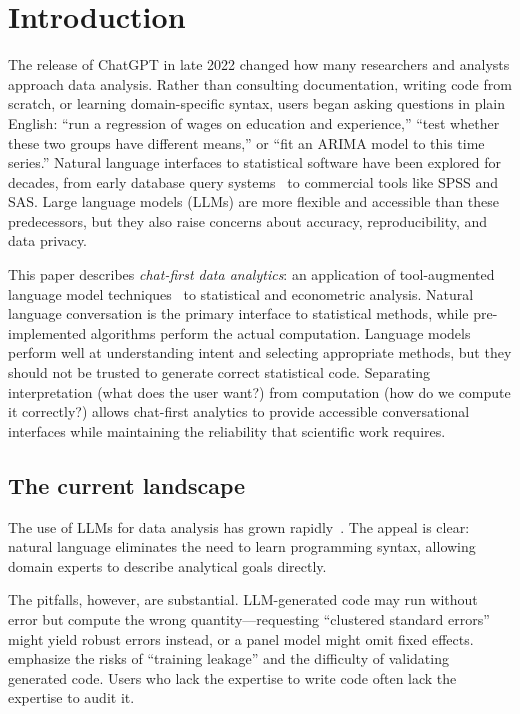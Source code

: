
\section{Introduction} \label{sec:intro}

The release of ChatGPT in late 2022 changed how many researchers and analysts
approach data analysis. Rather than consulting documentation, writing code from
scratch, or learning domain-specific syntax, users began asking questions in
plain English: ``run a regression of wages on education and experience,'' ``test
whether these two groups have different means,'' or ``fit an ARIMA model to this
time series.'' Natural language interfaces to statistical software have
been explored for decades, from early database query
systems~\citep{Androutsopoulos+etal:1995} to commercial tools like SPSS and SAS. Large
language models (LLMs) are more flexible and accessible than these predecessors,
but they also raise concerns about accuracy, reproducibility, and data privacy.

This paper describes \emph{chat-first data analytics}: an application of
tool-augmented language model
techniques~\citep{Schick+etal:2023, Yao+etal:2023} to statistical and econometric analysis.
Natural language conversation is the primary interface
to statistical methods, while pre-implemented algorithms perform the
actual computation. Language models perform well at understanding intent and
selecting appropriate methods, but they should not be trusted to generate
correct statistical code. Separating interpretation (what does the user want?)
from computation (how do we compute it correctly?) allows chat-first analytics
to provide accessible conversational interfaces while maintaining the reliability
that scientific work requires.

\subsection{The current landscape}

The use of LLMs for data analysis has grown
rapidly~\citep{Nejjar+etal:2024, Sun+etal:2025:Survey, Korinek:2025}. The appeal is
clear: natural language eliminates the need to learn programming syntax, allowing
domain experts to describe analytical goals directly.

The pitfalls, however, are substantial. LLM-generated code may run without error
but compute the wrong quantity---requesting ``clustered standard errors'' might
yield robust errors instead, or a panel model might omit fixed effects.
\cite{Ludwig+Mullainathan+Rambachan:2025} emphasize the risks of ``training
leakage'' and the difficulty of validating generated code. Users who lack the
expertise to write code often lack the expertise to audit it.

